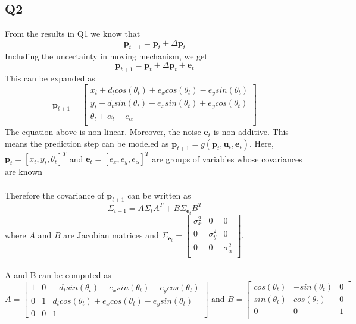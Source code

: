 \documentclass[12pt, a4paper]{article}
\begin{document}
\subsection{Q2}
From the results in Q1 we know that
\[\mathbf{p}_{t+1} = \mathbf{p}_{t} + \Delta \mathbf{p}_t\]
Including the uncertainty in moving mechanism, we get
\[\mathbf{p}_{t+1} = \mathbf{p}_{t} + \Delta \mathbf{p}_t + \mathbf{e}_t\]
This can be expanded as
\[\mathbf{p}_{t+1} = \begin{bmatrix}
  x_t + d_tcos(\theta_t) + e_xcos(\theta_t) - e_ysin(\theta_t)\\
  y_t + d_tsin(\theta_t) + e_xsin(\theta_t) + e_ycos(\theta_t)\\
  \theta_t + \alpha_t + e_{\alpha}\\
\end{bmatrix}\]
The equation above is non-linear. Moreover, the noise $\mathbf{e}_t$ is non-additive. This means the prediction step can be modeled as $\mathbf{p}_{t+1} = g(\mathbf{p}_t, \mathbf{u}_t, \mathbf{e}_t)$. Here, $\mathbf{p}_t = [x_t, y_t, \theta_t]^T$ and $\mathbf{e}_t = [e_x, e_y, e_{\alpha}]^T$ are groups of variables whose covariances are known\\\\
Therefore the covariance of $\mathbf{p}_{t+1}$ can be written as 
\begin{equation}
  \label{q2_1}
\Sigma_{t+1} = A\Sigma_tA^T + B\Sigma_{\mathbf{e}_t}B^T
\end{equation}
where $A$ and $B$ are Jacobian matrices and $\Sigma_{\mathbf{e}_t}=\begin{bmatrix}
  \sigma_x^2 & 0 & 0\\
  0 & \sigma_y^2 & 0\\
  0  & 0 & \sigma_{\alpha}^2\\
\end{bmatrix}$.\\\\
A and B can be computed as 
\[A = \begin{bmatrix}
  1 & 0 & -d_tsin(\theta_t)-e_xsin(\theta_t) - e_ycos(\theta_t)\\
  0 & 1 & d_tcos(\theta_t)+e_xcos(\theta_t)-e_ysin(\theta_t)\\
  0 & 0 & 1
\end{bmatrix} \text{ and } B = \begin{bmatrix}
  cos(\theta_t) & -sin(\theta_t) & 0\\
  sin(\theta_t) & cos(\theta_t) & 0\\
  0  & 0 & 1\\
\end{bmatrix}\]
\end{document}
